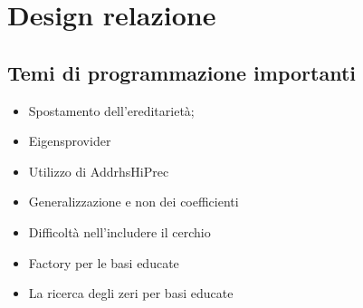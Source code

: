 \chapter{Design relazione}


\section{Temi di programmazione importanti}
\begin{itemize}
\item Spostamento dell'ereditariet\`a;
\item Eigensprovider
\item Utilizzo di AddrhsHiPrec
\item Generalizzazione e non dei coefficienti
\item Difficolt\`a nell'includere il cerchio
\item Factory per le basi educate
\item La ricerca degli zeri per basi educate
\end{itemize}
